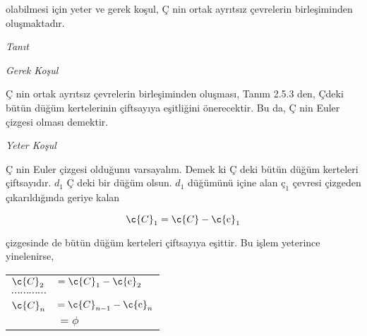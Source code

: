 \documentclass[11pt]{amsbook}
\begin{document}

olabilmesi i\c{c}in yeter ve gerek koşul, \c{C} nin ortak ayrıtsız \c{c}evrelerin birleşiminden oluşmaktadır.

\emph{Tanıt}

\emph{Gerek Koşul}

\c{C} nin ortak ayrıtsız \c{c}evrelerin birleşiminden oluşması, Tanım 2.5.3 den, \c{C}deki b\"{u}t\"{u}n d\"{u}ğ\"{u}m kertelerinin \c{c}iftsayıya eşitliğini \"{o}nerecektir. Bu da, \c{C} nin Euler \c{c}izgesi olması demektir.

\emph{Yeter Koşul}

\c{C} nin Euler \c{c}izgesi olduğunu varsayalım. Demek ki \c{C} deki b\"{u}t\"{u}n d\"{u}ğ\"{u}m kerteleri \c{c}iftsayıdır. $d_1$ \c{C} deki bir d\"{u}ğ\"{u}m olsun. $d_1$ d\"{u}ğ\"{u}m\"{u}n\"{u} i\c{c}ine alan $\text{\c{c}}_1$ \c{c}evresi \c{c}izgeden \c{c}ıkarıldığında geriye kalan

\begin{equation*}
\c{C}_1 = \c{C} - \text{\c{c}}_1
\end{equation*}

\c{c}izgesinde de b\"{u}t\"{u}n d\"{u}ğ\"{u}m kerteleri \c{c}iftsayıya eşittir. Bu işlem yeterince yinelenirse,

\begin{center}
	\begin{tabular}{ll}
		$\c{C}_2$ & $ = \c{C}_1 - \text{\c{c}}_2$ \\
		\multicolumn{2}{l}{$\cdots\cdots\cdots\cdots$} \\
		$\c{C}_n$ & $ = \c{C}_{n-1} - \text{\c{c}}_n$ \\
		& $ = \phi$
	\end{tabular}
\end{center}
\end{document}

